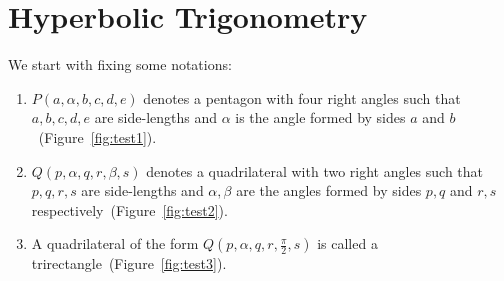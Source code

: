 \chapter{Hyperbolic Trigonometry} 

\noindent We start with fixing some notations:
\begin{enumerate}
	\item $P(a,\alpha,b,c,d,e)$ denotes a pentagon with four right angles such that $a,b,c,d,e$ are side-lengths and $\alpha$ is the angle formed by sides $a$ and $b$~(Figure~\ref{fig:test1}). 
	
	\item $Q(p,\alpha,q,r,\beta,s)$ denotes a quadrilateral with two right angles such that $p,q,r,s$ are side-lengths and $\alpha, \beta$ are the angles formed by sides $p,q$ and $r,s$ respectively~(Figure~\ref{fig:test2}). 
	
	\item A quadrilateral of the form $Q(p, \alpha,q,r,\frac{\pi}{2},s)$ is called a trirectangle~(Figure~\ref{fig:test3}).
	
\end{enumerate}



